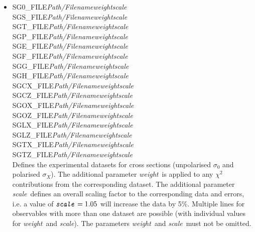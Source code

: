 \documentclass[a4paper,10pt]{article}
\def\bl{\phantom{0}}
\def\tt{\ttfamily}
\def\rm{\rmfamily}
\begin{document}
\begin{itemize}
\item
\tt SG0\_FILE\bl\bl \textit{Path/Filename}\bl \textit{weight}\bl \textit{scale}\rm\\
\tt SGS\_FILE\bl\bl \textit{Path/Filename}\bl \textit{weight}\bl \textit{scale}\rm\\
\tt SGT\_FILE\bl\bl \textit{Path/Filename}\bl \textit{weight}\bl \textit{scale}\rm\\
\tt SGP\_FILE\bl\bl \textit{Path/Filename}\bl \textit{weight}\bl \textit{scale}\rm\\
\tt SGE\_FILE\bl\bl \textit{Path/Filename}\bl \textit{weight}\bl \textit{scale}\rm\\
\tt SGF\_FILE\bl\bl \textit{Path/Filename}\bl \textit{weight}\bl \textit{scale}\rm\\
\tt SGG\_FILE\bl\bl \textit{Path/Filename}\bl \textit{weight}\bl \textit{scale}\rm\\
\tt SGH\_FILE\bl\bl \textit{Path/Filename}\bl \textit{weight}\bl \textit{scale}\rm\\
\tt SGCX\_FILE\bl   \textit{Path/Filename}\bl \textit{weight}\bl \textit{scale}\rm\\
\tt SGCZ\_FILE\bl   \textit{Path/Filename}\bl \textit{weight}\bl \textit{scale}\rm\\
\tt SGOX\_FILE\bl   \textit{Path/Filename}\bl \textit{weight}\bl \textit{scale}\rm\\
\tt SGOZ\_FILE\bl   \textit{Path/Filename}\bl \textit{weight}\bl \textit{scale}\rm\\
\tt SGLX\_FILE\bl   \textit{Path/Filename}\bl \textit{weight}\bl \textit{scale}\rm\\
\tt SGLZ\_FILE\bl   \textit{Path/Filename}\bl \textit{weight}\bl \textit{scale}\rm\\
\tt SGTX\_FILE\bl   \textit{Path/Filename}\bl \textit{weight}\bl \textit{scale}\rm\\
\tt SGTZ\_FILE\bl   \textit{Path/Filename}\bl \textit{weight}\bl \textit{scale}\rm\\
Defines the experimental datasets for cross sections (unpolarised $\sigma_0$ and polarised $\sigma_X$). The additional
parameter \tt\textit{weight}\rm\ is applied to any $\chi^2$ contributions from the corresponding dataset. The additional
parameter \tt\textit{scale}\rm\ defines an overall scaling factor to the corresponding data and errors, i.e.
a value of $\mbox{\tt\textit{scale}\rm} = 1.05$ will increase the data by 5\%.
Multiple lines for observables with more than one dataset are possible (with individual values for
\tt\textit{weight}\rm\ and \tt\textit{scale}\rm).
The parameters \tt\textit{weight}\rm\ and \tt\textit{scale}\rm\ must not be omitted.


\end{itemize}
\end{document}
